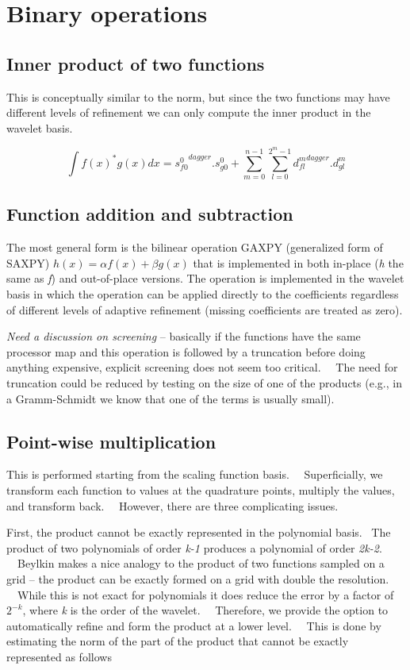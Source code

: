 \documentclass[letterpaper]{book}
\begin{document}
\section[Binary operations]{\rmfamily Binary operations}
\subsection[Inner product of two functions]{\rmfamily Inner product of two functions}
This is conceptually similar to the norm, but since the two functions may have different levels of refinement we can
only compute the inner product in the wavelet basis. \ 

\begin{equation}
\int f(x)^{\text{*}}g(x)dx=\left.s_{f0}^{0}\right.^{dagger}.s_{g0}^{0}+\sum _{m=0}^{n-1}\sum
_{l=0}^{2^{m}-1}\left.d_{fl}^{m}\right.^{dagger}.d_{gl}^{m}
\end{equation}
\subsection[Function addition and subtraction]{\rmfamily Function addition and subtraction}
The most general form is the bilinear operation GAXPY (generalized form of SAXPY)  $h(x)=\alpha f(x)+\beta g(x)$ that is
implemented in both in-place (\textit{h} the same as \textit{f}) and out-of-place versions. The operation is
implemented in the wavelet basis in which the operation can be applied directly to the coefficients regardless of
different levels of adaptive refinement (missing coefficients are treated as zero).

\textit{Need a discussion on screening} -- basically if the functions have the same processor map and this operation is
followed by a truncation before doing anything expensive, explicit screening does not seem too critical. \ \ The need
for truncation could be reduced by testing on the size of one of the products (e.g., in a Gramm-Schmidt we know that
one of the terms is usually small).

\subsection{Point-wise multiplication}
This is performed starting from the scaling function basis. \ \ Superficially, we transform each function to values at
the quadrature points, multiply the values, and transform back. \ \ However, there are three complicating issues. \ 

First, the product cannot be exactly represented in the polynomial basis. \ The product of two polynomials of order
\textit{k-1} produces a polynomial of order \textit{2k-2}. \ \ Beylkin makes a nice analogy to the product of two
functions sampled on a grid -- the product can be exactly formed on a grid with double the resolution. \ \ While this
is not exact for polynomials it does reduce the error by a factor of  $2^{-k}$, where \textit{k} is the order of the
wavelet. \ \ Therefore, we provide the option to automatically refine and form the product at a lower level. \ \ This
is done by estimating the norm of the part of the product that cannot be exactly represented as follows 
\end{document}
